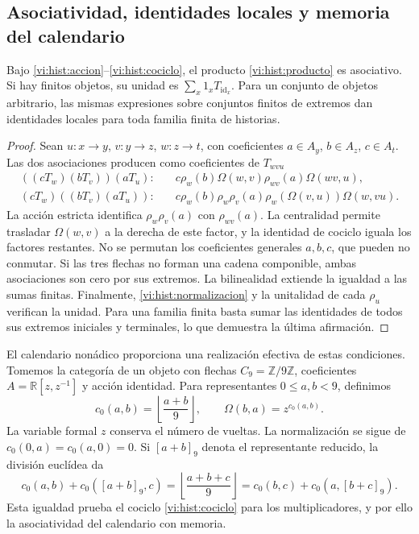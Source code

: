 \subsection{Asociatividad, identidades locales y memoria del calendario}
\label{vi:hist:asociatividad}

\begin{proposition}
Bajo \eqref{vi:hist:accion}--\eqref{vi:hist:cociclo}, el producto
\eqref{vi:hist:producto} es asociativo. Si hay finitos objetos, su unidad
es \(\sum_x1_xT_{\operatorname{id}_x}\). Para un conjunto de objetos
arbitrario, las mismas expresiones sobre conjuntos finitos de extremos
dan identidades locales para toda familia finita de historias.
\end{proposition}
\begin{proof}
Sean \(u:x\to y\), \(v:y\to z\), \(w:z\to t\), con coeficientes
\(a\in A_y\), \(b\in A_z\), \(c\in A_t\). Las dos asociaciones
producen como coeficientes de \(T_{wvu}\)
\begin{align*}
 ((cT_w)(bT_v))(aT_u):\quad&
 c\rho_w(b)\Omega(w,v)\rho_{wv}(a)\Omega(wv,u),\\
 (cT_w)((bT_v)(aT_u)):\quad&
 c\rho_w(b)\rho_w\rho_v(a)
 \rho_w(\Omega(v,u))\Omega(w,vu).
\end{align*}
La acción estricta identifica \(\rho_w\rho_v(a)\) con
\(\rho_{wv}(a)\). La centralidad permite trasladar
\(\Omega(w,v)\) a la derecha de este factor, y la identidad de cociclo
iguala los factores restantes. No se permutan los coeficientes generales
\(a,b,c\), que pueden no conmutar. Si las tres flechas no forman una
cadena componible, ambas asociaciones son cero por sus extremos.
La bilinealidad extiende la igualdad a las sumas finitas. Finalmente,
\eqref{vi:hist:normalizacion} y la unitalidad de cada \(\rho_u\)
verifican la unidad. Para una familia finita basta sumar las identidades
de todos sus extremos iniciales y terminales, lo que demuestra la última
afirmación.
\end{proof}

El calendario nonádico proporciona una realización efectiva de estas
condiciones. Tomemos la categoría de un objeto con flechas
\(C_9=\mathbb Z/9\mathbb Z\), coeficientes
\(A=\mathbb R[z,z^{-1}]\) y acción identidad. Para representantes
\(0\le a,b<9\), definimos
\begin{equation}
 c_0(a,b)=\left\lfloor\frac{a+b}{9}\right\rfloor,
 \qquad\Omega(b,a)=z^{c_0(a,b)}.
 \label{vi:hist:carry-calendario}
\end{equation}
La variable formal \(z\) conserva el número de vueltas. La normalización
se sigue de \(c_0(0,a)=c_0(a,0)=0\). Si \([a+b]_9\) denota el
representante reducido, la división euclídea da
\[
 c_0(a,b)+c_0([a+b]_9,c)
 =\left\lfloor\frac{a+b+c}{9}\right\rfloor
 =c_0(b,c)+c_0(a,[b+c]_9).
\]
Esta igualdad prueba el cociclo \eqref{vi:hist:cociclo} para los
multiplicadores, y por ello la asociatividad del calendario con memoria.

